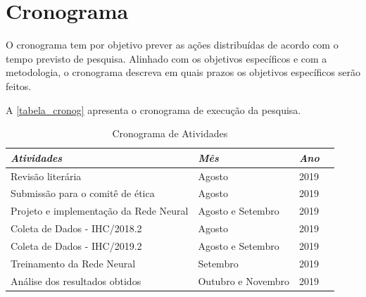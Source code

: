 \documentclass[
	12pt,				%
	openright,			%
	oneside,
	a4paper,			%
	english,			%
	french,				%
	spanish,			%
	brazil,				%
	]{abntex2}
\begin{document}


\chapter{Cronograma}

    O cronograma tem por objetivo prever as ações distribuídas de acordo com o tempo previsto de pesquisa. Alinhado com os objetivos específicos e com a metodologia, o cronograma descreva em quais prazos os objetivos específicos serão feitos.

A \autoref{tabela_cronog} apresenta o cronograma de execução da pesquisa. 

\begin{table}[!htb]
\centering
\caption{Cronograma de Atividades}
\label{tabela_cronog}
\begin{tabular}{@{}llll@{}}
\toprule
\textit{Atividades}                    & \textit{Mês}       & \textit{Ano}   \\ \midrule
Revisão literária                      & Agosto             & 2019      \\
Submissão para o comitê de ética       & Agosto           & 2019      \\
Projeto e implementação da Rede Neural & Agosto e Setembro  & 2019      \\
Coleta de Dados - IHC/2018.2           & Agosto             & 2019      \\
Coleta de Dados - IHC/2019.2           & Agosto e Setembro  & 2019      \\
Treinamento da Rede Neural             & Setembro           & 2019      \\
Análise dos resultados obtidos         & Outubro e Novembro & 2019      \\
                                \bottomrule
\end{tabular}
\end{table}







\end{document}
